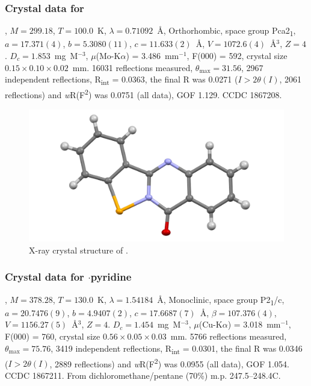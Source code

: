 \begin{refsection}
\subsubsection{Crystal data for \texorpdfstring{}{C14H8N2OSe}}
, $M=299.18$, $T=100.0$~K, $\lambda=0.71092$~\AA, Orthorhombic, space group Pca2\textsubscript{1}, $a = 17.371(4)$, $b = 5.3080(11)$, $c = 11.633(2)$~\AA, $V = 1072.6(4)$~\AA$^{3}$, $Z = 4$.
$D_{c}= 1.853$~mg~M$^{-3}$, $\mu$(Mo-K$\alpha$) = 3.486~mm$^{-1}$, F(000) = 592, crystal size $0.15 \times 0.10 \times 0.02$~mm.
16031 reflections measured, $\theta_{\mathrm{max}}=31.56$\degree, 2967 independent reflections, R\textsubscript{int} = 0.0363, the final R was 0.0271 ($I > 2\theta(I)$, 2061 reflections) and \emph{w}R(F\textsuperscript{2}) was 0.0751 (all data), GOF 1.129.
CCDC 1867208.

\begin{figure}
  \includegraphics[width=0.6\linewidth]{Figures/tetracycle-xtal.pdf}
  \caption{X-ray crystal structure of \texorpdfstring{}{C14H8N2OSe}.}
\end{figure}

\subsubsection{Crystal data for \texorpdfstring{$\cdot$pyridine}{C19H13N3OSe}}
, $M=378.28$, $T=130.0$~K, $\lambda=1.54184$~\AA, Monoclinic, space group P2\textsubscript{1}/c, $a = 20.7476(9)$, $b = 4.9407(2)$, $c = 17.6687(7)$~\AA, $\beta = 107.376(4)$\degree, $V = 1156.27(5)$~\AA$^{3}$, $Z = 4$.
$D_{c} = 1.454$~mg~M$^{-3}$, $\mu$(Cu-K$\alpha$) = 3.018~mm$^{-1}$, F(000) = 760, crystal size $0.56 \times 0.05 \times 0.03$~mm.
5766 reflections measured, $\theta_{\mathrm{max}} = 75.76$\degree, 3419 independent reflections, R\textsubscript{int} = 0.0301, the final R was 0.0346 ($I > 2\theta(I)$, 2889 reflections) and \emph{w}R(F\textsuperscript{2}) was 0.0955 (all data), GOF 1.054.
CCDC 1867211.
From dichloromethane/pentane (70\%) m.p. 247.5--248.4\degree C.


\end{refsection}
